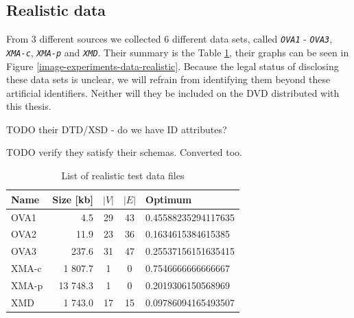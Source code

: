 \documentclass[a4paper,12pt,oneside]{report}
\newcommand{\jmodule}[1]{\texttt{\textit{#1}}}
\theoremstyle{definition}
\begin{document}
\subsection{Realistic data}

From 3 different sources we collected 6 different data sets, called \jmodule{OVA1} - \jmodule{OVA3}, \jmodule{XMA-c}, \jmodule{XMA-p} and \jmodule{XMD}. Their summary is the Table \ref{table-experiments-data-realistic}, their graphs can be seen in Figure \ref{image-experiments-data-realistic}. Because the legal status of disclosing these data sets is unclear, we will refrain from identifying them beyond these artificial identifiers. Neither will they be included on the DVD distributed with this thesis.

TODO their DTD/XSD - do we have ID attributes?

TODO verify they satisfy their schemas. Converted too.

\begin{table}
  \caption{List of realistic test data files}
  \bigskip
  \label{table-experiments-data-realistic}
  \centering
  \begin{tabular}{l | r | c | c | l}
	Name  & Size [kb] & $|V|$ & $|E|$ & Optimum \\
	\hline
	OVA1  & 4.5      & 29 & 43 & 0.45588235294117635 \\
	OVA2  & 11.9     & 23 & 36 & 0.1634615384615385  \\ 
	OVA3  & 237.6    & 31 & 47 & 0.25537156151635415 \\
	XMA-c & 1 807.7  & 1  & 0  & 0.7546666666666667  \\
	XMA-p & 13 748.3 & 1  & 0  & 0.2019306150568969  \\
	XMD   & 1 743.0  & 17 & 15 & 0.09786094165493507 \\
  \end{tabular}
\end{table}
\end{document}
